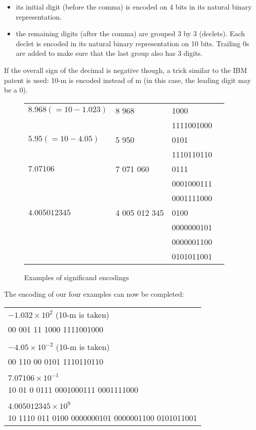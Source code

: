 \documentclass{acm_proc_article-sp}
\begin{document}
\begin{itemize}
\item its initial digit (before the comma) is encoded on 4 bits in its natural binary representation.
\item the remaining digits (after the comma) are grouped 3 by 3 (declets). Each declet is encoded in its natural binary representation on 10 bits. Trailing 0s are added to make sure that the last group also has 3 digits.
\end{itemize}

If the overall sign of the decimal is negative though, a trick similar to the IBM patent is used: 10-m is encoded instead of m (in this case, the leading digit may be a 0).

\begin{figure}
\caption{Examples of significand encodings}
\label{figure-significand-encoding}
\center
\begin{tabular}{|l|l|l|l}
\hline
$8.968 (=10-1.023)$ & 8 968 & 1000 \\
& & 1111001000 \\
\hline
$5.95 (=10-4.05)$ & 5 950 & 0101 \\
& & 1110110110\\
\hline
$7.07106$ & 7 071 060 & 0111 \\
& & 0001000111\\
& & 0001111000\\
\hline
$4.005012345$ & 4 005 012 345 & 0100 \\
& & 0000000101\\
& & 0000001100\\
& & 0101011001\\
\hline
\end{tabular}
\end{figure}

The encoding of our four examples can now be completed:

\begin{tabular}{l}
$- 1.032 \times 10^2$ (10-m is taken)\\
00 001 11 1000 1111001000\\
\\
$-4.05 \times 10^{-2}$ (10-m is taken)\\
00 110 00 0101 1110110110\\
\\
$7.07106 \times 10^{-1}$\\
10 01 0 0111 0001000111 0001111000\\
\\
$4.005012345 \times 10^9$\\
10 1110 011 0100 0000000101 0000001100 0101011001\\
\end{tabular}
\end{document}
